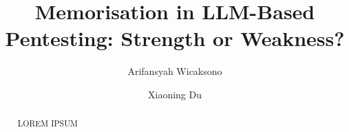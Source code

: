 \documentclass[acmtog]{acmart}
\begin{document}
\title{Memorisation in LLM-Based Pentesting: Strength or Weakness?}

\author{Arifansyah Wicaksono}

\author{Xiaoning Du}


\renewcommand{\shortauthors}{Wicaksono, Arifansyah}

\begin{abstract}
  LOREM IPSUM
\end{abstract}

\end{document}
